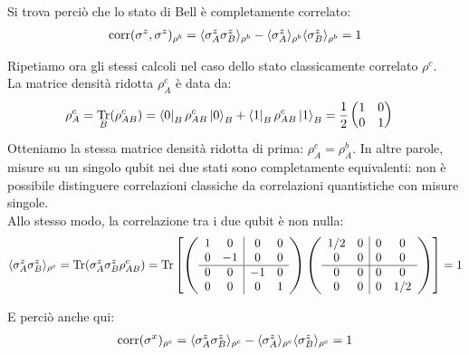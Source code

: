 \documentclass[../../InformazioneQuantistica.tex]{subfiles}
\begin{document}
Si trova perciò che lo stato di Bell è completamente correlato:
\begin{align*}
\operatorname{corr}(\sigma^z, \sigma^z)_{\rho^b} = \langle \sigma_A^z \sigma_B^z\rangle_{\rho^b} - \langle \sigma_A^z\rangle_{\rho^b} \langle \sigma_B^z\rangle_{\rho^b} = 1
\end{align*}

Ripetiamo ora gli stessi calcoli nel caso dello stato classicamente correlato $\rho^c$.\\
La matrice densità ridotta $\rho_A^c$ è data da:
\begin{align*}
\rho_A^c &= \underset{B}{\operatorname{Tr}}(\rho_{AB}^c) = \Bra{0}_B \rho_{AB}^c \Ket{0}_B + \Bra{1}_B \rho_{AB}^c \Ket{1}_B = \frac{1}{2}\begin{pmatrix}1 & 0 \\ 0 & 1 \end{pmatrix}
\end{align*}
Otteniamo la stessa matrice densità ridotta di prima: $\rho_A^c = \rho_{A}^b$. In altre parole, misure su un singolo qubit nei due stati sono completamente equivalenti: non è possibile distinguere correlazioni classiche da correlazioni quantistiche con misure singole.\\

Allo stesso modo, la correlazione tra i due qubit è non nulla:
\begin{align*}
\langle \sigma_A^z \sigma_B^z\rangle_{\rho^c} = \operatorname{Tr}(\sigma_A^z \sigma_B^z \rho_{AB}^c) = \operatorname{Tr}\left[
\left( \begin{array}{cc|cc} 1 & 0 & 0 & 0\\ 0 & -1 & 0 & 0 \\ \hline 0 & 0 & -1 & 0 \\ 0 & 0 & 0 & 1 \end{array}\right)
\left( \begin{array}{cc|cc}1/2 & 0 & 0 & 0\\ 0 & 0 & 0 & 0\\ \hline 0 & 0 & 0 & 0 \\ 0 & 0 & 0 & 1/2 \end{array}\right)
\right] = 1
\end{align*}

E perciò anche qui:
\begin{align*}
\operatorname{corr}(\sigma^x)_{\rho^c} = \langle \sigma_A^z \sigma_B^z\rangle_{\rho^c} - \langle \sigma_A^z\rangle_{\rho^c} \langle \sigma_B^z\rangle_{\rho^c} = 1
\end{align*}
\end{document}

